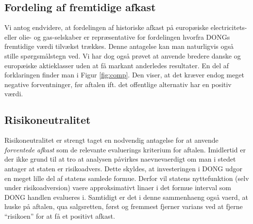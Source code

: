 \documentclass{article}
\begin{document}


\subsection{Fordeling af fremtidige afkast}

Vi antog endvidere, at fordelingen af historiske afkast på europæiske electricitets- eller olie- og gas-selskaber er repræsentative for fordelingen hvorfra DONGs fremtidige værdi tilvækst trækkes. Denne antagelse kan man naturligvis også stille spørgsmålstegn ved. Vi har dog også prøvet at anvende bredere danske og europæiske aktieklasser uden at få markant anderledes resultater. En del af forklaringen finder man i Figur \ref{fig:comp}. Den viser, at det kræver endog meget negative forventninger, før aftalen ift. det offentlige alternativ har en positiv værdi.


\subsection{Risikoneutralitet}

Risikoneutralitet er strengt taget en nodvendig antagelse for at anvende \emph{forventede afkast} som de relevante evaluerings kriterium for aftalen. Imidlertid er der ikke grund til at tro at analysen påvirkes naevnevaerdigt om man i stedet antager at staten er risikoadvers. Dette skyldes, at investeringen i DONG udgor en meget lille del af statens samlede formue. Derfor vil statens nyttefunktion (selv under risikoadversion) vaere approksimativt linaer i det formue interval som DONG handlen evalueres i. Samtidigt er det i denne sammenhaeng også vaerd, at huske på aftalen, qua salgsretten, først og fremmest fjerner varians ved at fjerne \enquote{risikoen} for at få et positivt afkast. 

\end{document}
